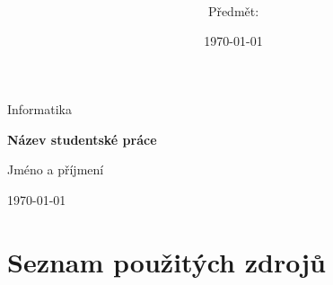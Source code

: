 \documentclass[a4paper,12pt]{article}
\title{\textbf{\nazevPrace}}
\author{\autorPrace \\ \small Předmět: \predmetPrace}
\date{\today}
\newcommand{\nazevPrace}{Název studentské práce}
\newcommand{\autorPrace}{Jméno a příjmení}
\newcommand{\predmetPrace}{Informatika}
\begin{document}
\begin{titlepage}
  \centering
  \vspace*{2cm}
  {\Large \predmetPrace \par}
  \vspace{2.5cm}
  {\Huge \bfseries \nazevPrace \par}
  \vspace{1.5cm}
  {\Large \autorPrace \par}
  \vfill
  {\large \today \par}
\end{titlepage}

\tableofcontents
\newpage



\newpage
\section*{Seznam použitých zdrojů}

\end{document}
